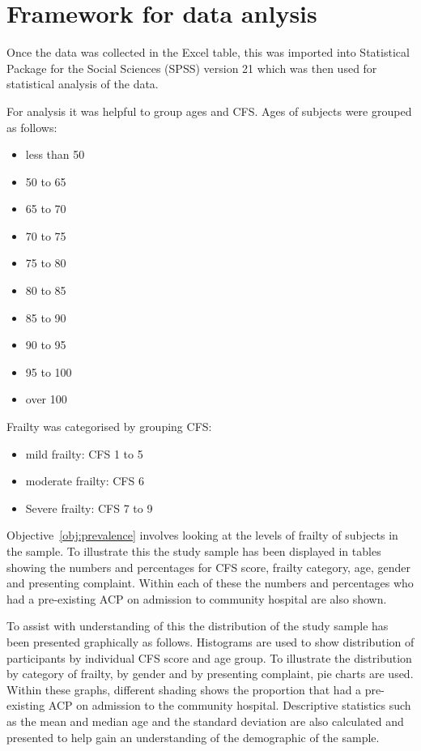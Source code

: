 \documentclass
[
	12pt,
	a4paper,
	oneside,
]{report}
\begin{document}
\section{Framework for data anlysis}

Once the data was collected in the Excel table, this was imported into 
Statistical Package for the Social Sciences (SPSS) version 21 which was then
used for statistical analysis of the data.

For analysis it was helpful to group ages and CFS. Ages of subjects were 
grouped as follows:
\begin{itemize}
	\item less than 50
	\item 50 to 65
	\item 65 to 70
	\item 70 to 75
 	\item 75 to 80
	\item 80 to 85
 	\item 85 to 90
 	\item 90 to 95
 	\item 95 to 100
 	\item over 100
\end{itemize}

Frailty was categorised by grouping CFS:
\begin{itemize}
	\item mild frailty: CFS 1 to 5
	\item moderate frailty: CFS 6
	\item Severe frailty: CFS 7 to 9
\end{itemize}

Objective~\ref{obj:prevalence} involves looking at the levels of frailty of
subjects in the sample. To illustrate this the study sample has been 
displayed in tables showing the numbers and percentages for CFS score, 
frailty category, age, gender and presenting complaint. Within each
of these the numbers and percentages who had a pre-existing ACP
on admission to community hospital are also shown.

To assist with understanding of this the distribution of the study sample 
has been presented graphically as follows.
Histograms are used to show distribution of participants by individual 
CFS score and age group.  
To illustrate the distribution by category of frailty, by gender and by presenting 
complaint, pie charts are used. Within these graphs, different shading shows
the proportion that had a pre-existing ACP on admission to the community hospital.
Descriptive statistics such as the mean and median age and the standard deviation
are also calculated and presented to help gain an understanding of the 
demographic of the sample.
\end{document}

